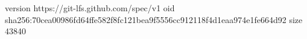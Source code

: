 version https://git-lfs.github.com/spec/v1
oid sha256:70cea00986fd64ffe582f8fc121bea9f5556cc912118f4d1eaa974e1fe664d92
size 43840
